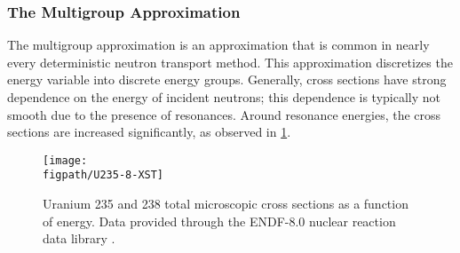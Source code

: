 {{{      \subsubsection{The Multigroup Approximation}{\label{sssec:NTT:The Multigroup Approximation}
        The multigroup approximation is an approximation that is common in nearly every deterministic neutron transport method.
        This approximation discretizes the energy variable into discrete energy groups.
        Generally, cross sections have strong dependence on the energy of incident neutrons; this dependence is typically not smooth due to the presence of resonances.
        Around resonance energies, the cross sections are increased significantly, as observed in \cref{fig:NTT:Cross Section plot}.

        \begin{figure}[h]
          \centering
          \texttt{[image: \\figpath/U235-8-XST]}
          \caption{Uranium 235 and 238 total microscopic cross sections as a function of energy. Data provided through the ENDF-8.0 nuclear reaction data library \cite{ENDF8}.}
          \label{fig:NTT:Cross Section plot}
        \end{figure}

}}}}
